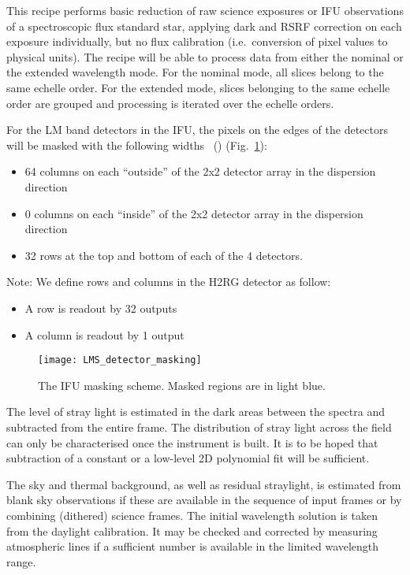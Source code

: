 This recipe performs basic reduction of raw science exposures or IFU
observations of a spectroscopic flux standard star, applying
dark and RSRF correction on each exposure individually, but no flux calibration
(i.e.~conversion of pixel values to physical units).
The
recipe will be able to process data from either the nominal or the
extended wavelength mode. For the nominal mode, all slices belong to
the same echelle order. For the extended mode, slices belonging to the
same echelle order are grouped and processing is iterated over the
echelle orders.

For the LM band detectors in the IFU, the pixels on the edges of the detectors will be masked with the following widths~\cite{matisse_minutes} () (Fig.~\ref{fig:ifu_detector_masking}):
\begin{itemize}
\item 64 columns on each ``outside'' of the 2x2 detector array in the dispersion direction
\item 0 columns on each ``inside'' of the 2x2 detector array in the dispersion direction
\item 32 rows at the top and bottom of each of the 4 detectors.
\end{itemize}
Note: We define rows and columns in the H2RG detector as follow:
\begin{itemize}
\item A row is readout by 32 outputs
\item A column is readout by 1 output
\end{itemize}

\begin{figure}[hb]
  \centering
  \texttt{[image: LMS\_detector\_masking]}
  \caption[The IFU masking scheme]{%
    The IFU masking scheme. Masked regions are in light blue.}
  \label{fig:ifu_detector_masking}
\end{figure}



The level of stray light is estimated in the dark areas between the
spectra and subtracted from the entire frame. The distribution of
stray light across the field can only be characterised once the
instrument is built. It is to be hoped that subtraction of a constant
or a low-level 2D polynomial fit will be sufficient.

The sky and thermal background, as well as residual straylight, is
estimated from blank sky observations if these are available in the
sequence of input frames or by combining (dithered) science
frames. The initial wavelength solution is taken from the daylight
calibration. It may be checked and corrected by measuring atmospheric
lines if a sufficient number is available in the limited wavelength
range.

